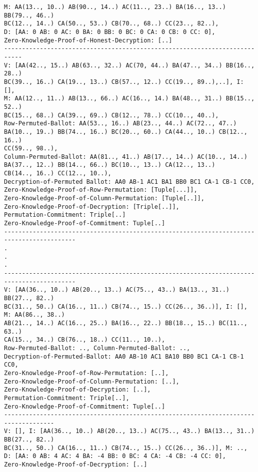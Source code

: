 \documentclass{llncs}
\begin{document}
\begin{verbatim}
M: AA(13.., 10..) AB(90.., 14..) AC(11.., 23..) BA(16.., 13..) BB(79.., 46..)
BC(12.., 14..) CA(50.., 53..) CB(70.., 68..) CC(23.., 82..), 
D: [AA: 0 AB: 0 AC: 0 BA: 0 BB: 0 BC: 0 CA: 0 CB: 0 CC: 0], 
Zero-Knowledge-Proof-of-Honest-Decryption: [..]
---------------------------------------------------------------------------
V: [AA(42.., 15..) AB(63.., 32..) AC(70, 44..) BA(47.., 34..) BB(16.., 28..)
BC(39.., 16..) CA(19.., 13..) CB(57.., 12..) CC(19.., 89..),..], I:  [], 
M: AA(12.., 11..) AB(13.., 66..) AC(16.., 14.) BA(48.., 31..) BB(15.., 52..)
BC(15.., 68..) CA(39.., 69..) CB(12.., 78..) CC(10.., 40..),
Row-Permuted-Ballot: AA(53.., 16..) AB(23.., 44..) AC(72.., 47..)
BA(10.., 19..) BB(74.., 16..) BC(20.., 60..) CA(44.., 10..) CB(12.., 16..)
CC(59.., 98..),
Column-Permuted-Ballot: AA(81.., 41..) AB(17.., 14..) AC(10.., 14..) 
BA(37.., 12..) BB(14.., 66..) BC(10.., 13..) CA(12.., 13..) 
CB(14.., 16..) CC(12.., 10..),
Decryption-of-Permuted Ballot: AA0 AB-1 AC1 BA1 BB0 BC1 CA-1 CB-1 CC0,
Zero-Knowledge-Proof-of-Row-Permutation: [Tuple[...]], 
Zero-Knowledge-Proof-of-Column-Permutation: [Tuple[..]], 
Zero-Knowledge-Proof-of-Decryption: [Triple[..]], 
Permutation-Commitment: Triple[..]
Zero-Knowledge-Proof-of-Commitment: Tuple[..]
------------------------------------------------------------------------------------------
.
.
.
------------------------------------------------------------------------------------------
V: [AA(36.., 10..) AB(20.., 13..) AC(75.., 43..) BA(13.., 31..) BB(27.., 82..)
BC(31.., 50..) CA(16.., 11..) CB(74.., 15..) CC(26.., 36..)], I: [], M: AA(86.., 38..)
AB(21.., 14..) AC(16.., 25..) BA(16.., 22..) BB(18.., 15..) BC(11.., 63..)
CA(15.., 34..) CB(76.., 18..) CC(11.., 10..), 
Row-Permuted-Ballot: .., Column-Permuted-Ballot: .., 
Decryption-of-Permuted-Ballot: AA0 AB-10 AC1 BA10 BB0 BC1 CA-1 CB-1 CC0,
Zero-Knowledge-Proof-of-Row-Permutation: [..],
Zero-Knowledge-Proof-of-Column-Permutation: [..], 
Zero-Knowledge-Proof-of-Decryption: [..], 
Permutation-Commitment: Triple[..], 
Zero-Knowledge-Proof-of-Commitment: Tuple[..]
------------------------------------------------------------------------------------
V: [], I: [AA(36.., 10..) AB(20.., 13..) AC(75.., 43..) BA(13.., 31..) BB(27.., 82..)
BC(31.., 50..) CA(16.., 11..) CB(74.., 15..) CC(26.., 36..)], M: .., 
D: [AA: 0 AB: 4 AC: 4 BA: -4 BB: 0 BC: 4 CA: -4 CB: -4 CC: 0],
Zero-Knowledge-Proof-of-Decryption: [..]

\end{verbatim}
\end{document}
